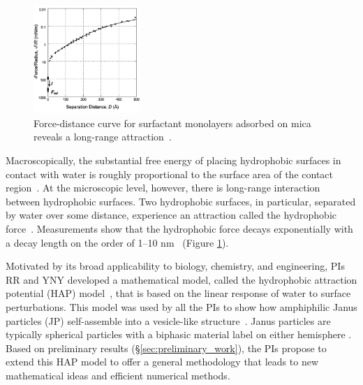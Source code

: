 \begin{figure}
\vspace{-8pt}
\centerline
{
\includegraphics[width=0.36\textwidth]{figures/Background/LongRangeForce.jpg}
}
\caption{\label{fig:force_distance}
Force-distance curve for surfactant
monolayers adsorbed on mica reveals a long-range
attraction~\cite{Lin2005}.}
\end{figure}

Macroscopically, the substantial free energy of placing hydrophobic
surfaces in contact with water is roughly proportional to the surface
area of the contact region~\cite{Bjorneholm2016}.
At the microscopic level, however, there is long-range interaction
between hydrophobic surfaces. Two hydrophobic surfaces, in particular,
separated by water over some distance, experience an attraction
called the
hydrophobic force~\cite{Lum1999, Meyer2006, Hammer2010, KaScScNe16}.
Measurements show that the hydrophobic force decays exponentially with a
decay length on the order of 1--10 nm~
\cite{Israelachvili1984,Marcelja1977,Christenson2001,Lin2005,Taetal13}
(Figure \ref{fig:force_distance}).

Motivated by its broad applicability to biology, chemistry, and engineering,
PIs RR and YNY developed a mathematical model, called the
hydrophobic attraction potential (HAP) model~\cite{Fu2018_SIAM},
that is based on
the linear response of water to surface perturbations. This model was
used by all the PIs to show how amphiphilic Janus particles (JP)
self-assemble into a vesicle-like structure~\cite{FuQuRyYo20}.
Janus particles are typically spherical particles with a biphasic
material label on either hemisphere \cite{CaFaRaVe89,Gaetal13,Mallory2017,HaBr20,McBr21}.
Based on
preliminary results (\S\ref{sec:preliminary_work}), the PIs propose to
extend this HAP model to offer a general methodology that leads
to new mathematical ideas and efficient numerical methods.

